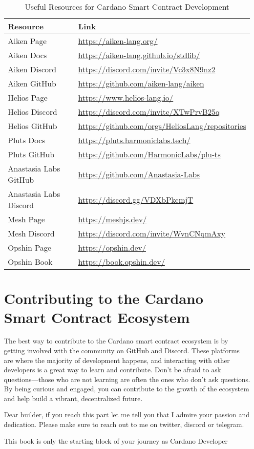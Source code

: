 \begin{table}[ht]
\centering
\begin{tabular}{|l|l|}
\hline
\textbf{Resource} & \textbf{Link} \\ \hline
Aiken Page & \url{https://aiken-lang.org/} \\ \hline
Aiken Docs & \url{https://aiken-lang.github.io/stdlib/} \\ \hline
Aiken Discord & \url{https://discord.com/invite/Vc3x8N9nz2} \\ \hline
Aiken GitHub & \url{https://github.com/aiken-lang/aiken} \\ \hline
Helios Page & \url{https://www.helios-lang.io/} \\ \hline
Helios Discord & \url{https://discord.com/invite/XTwPrvB25q} \\ \hline
Helios GitHub & \url{https://github.com/orgs/HeliosLang/repositories} \\ \hline
Pluts Docs & \url{https://pluts.harmoniclabs.tech/} \\ \hline
Pluts GitHub & \url{https://github.com/HarmonicLabs/plu-ts} \\ \hline
Anastasia Labs GitHub & \url{https://github.com/Anastasia-Labs} \\ \hline
Anastasia Labs Discord & \url{https://discord.gg/VDXbPkcmjT} \\ \hline
Mesh Page & \url{https://meshjs.dev/} \\ \hline
Mesh Discord & \url{https://discord.com/invite/WvnCNqmAxy} \\ \hline
Opshin Page & \url{https://opshin.dev/} \\ \hline
Opshin Book & \url{https://book.opshin.dev/} \\ \hline
\end{tabular}
\caption{Useful Resources for Cardano Smart Contract Development}
\end{table}

\section{Contributing to the Cardano Smart Contract Ecosystem}
The best way to contribute to the Cardano smart contract ecosystem is by getting involved with the community on GitHub and Discord. These platforms are where the majority of development happens, and interacting with other developers is a great way to learn and contribute. Don’t be afraid to ask questions—those who are not learning are often the ones who don’t ask questions. By being curious and engaged, you can contribute to the growth of the ecosystem and help build a vibrant, decentralized future.

Dear builder, if you reach this part let me tell you that I admire your passion and dedication.
Please make sure to reach out to me on twitter, discord or telegram.

This book is only the starting block of your journey as Cardano Developer